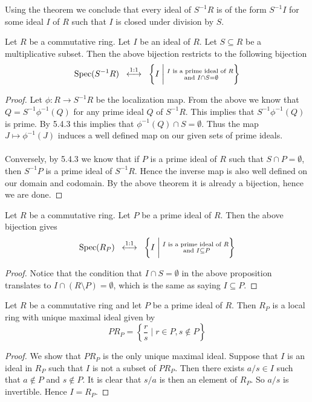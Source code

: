\documentclass[a4paper]{article}
\begin{document}
Using the theorem we conclude that every ideal of $S^{-1}R$ is of the form $S^{-1}I$ for some ideal $I$ of $R$ such that $I$ is closed under division by $S$. 

\begin{prp}{}{} Let $R$ be a commutative ring. Let $I$ be an ideal of $R$. Let $S\subseteq R$ be a multiplicative subset. Then the above bijection restricts to the following bijection $$\text{Spec}(S^{-1}R)\;\;\overset{1:1}{\longleftrightarrow}\;\;\left\{I\;\bigg{|}\;\substack{I\text{ is a prime ideal of }R\\\text{ and }I\cap S=\emptyset}\right\}$$ \tcbline
\begin{proof}
Let $\phi:R\to S^{-1}R$ be the localization map. From the above we know that $Q=S^{-1}\phi^{-1}(Q)$ for any prime ideal $Q$ of $S^{-1}R$. This implies that $S^{-1}\phi^{-1}(Q)$ is prime. By 5.4.3 this implies that $\phi^{-1}(Q)\cap S=\emptyset$. Thus the map $J\mapsto\phi^{-1}(J)$ induces a well defined map on our given sets of prime ideals. \\~\\

Conversely, by 5.4.3 we know that if $P$ is a prime ideal of $R$ such that $S\cap P=\emptyset$, then $S^{-1}P$ is a prime ideal of $S^{-1}R$. Hence the inverse map is also well defined on our domain and codomain. By the above theorem it is already a bijection, hence we are done. 
\end{proof}
\end{prp}

\begin{prp}{}{} Let $R$ be a commutative ring. Let $P$ be a prime ideal of $R$. Then the above bijection gives $$\text{Spec}(R_P)\;\;\overset{1:1}{\longleftrightarrow}\;\;\left\{I\;\bigg{|}\;\substack{I\text{ is a prime ideal of }R\\\text{ and }I\subseteq P}\right\}$$ \tcbline
\begin{proof}
Notice that the condition that $I\cap S=\emptyset$ in the above proposition translates to $I\cap (R\setminus P)=\emptyset$, which is the same as saying $I\subseteq P$. 
\end{proof}
\end{prp}

\begin{prp}{}{} Let $R$ be a commutative ring and let $P$ be a prime ideal of $R$. Then $R_P$ is a local ring with unique maximal ideal given by $$PR_P=\left\{\frac{r}{s}\;|\;r\in P,s\notin P\right\}$$ \tcbline
\begin{proof}
We show that $PR_P$ is the only unique maximal ideal. Suppose that $I$ is an ideal in $R_P$ such that $I$ is not a subset of $PR_P$. Then there exists $a/s\in I$ such that $a\notin P$ and $s\notin P$. It is clear that $s/a$ is then an element of $R_P$. So $a/s$ is invertible. Hence $I=R_P$. 
\end{proof}
\end{prp}
\end{document}
